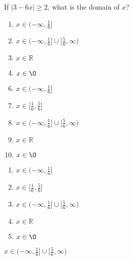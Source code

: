  
If $|3-6x|\geq 2$, what is the domain of $x$?


\ifsat
	\begin{enumerate}[label=\Alph*)]
		\item $x\in (-\infty,${\Large$\frac{1}{6}$}$]$
		\item $x\in (-\infty,${\Large$\frac{1}{6}$}$]\cup[${\Large$\frac{5}{6}$}$,\infty)$ %
		\item $x\in\mathbb{R} $ 
		\item $x\in\O$
	\end{enumerate}
\else
\fi

\ifacteven
	\begin{enumerate}[label=\textbf{\Alph*.},itemsep=\fill,align=left]
		\setcounter{enumii}{5}
		\item $x\in (-\infty,${\Large$\frac{1}{6}$}$]$
		\item $x\in [${\Large$\frac{1}{6}$}$,${\Large$\frac{5}{6}$}$]$
		\item $x\in (-\infty,${\Large$\frac{1}{6}$}$]\cup[${\Large$\frac{5}{6}$}$,\infty)$ %
		\addtocounter{enumii}{1}
		\item $x\in\mathbb{R} $ 
		\item $x\in\O$
	\end{enumerate}
\else
\fi

\ifactodd
	\begin{enumerate}[label=\textbf{\Alph*.},itemsep=\fill,align=left]
		\item $x\in (-\infty,${\Large$\frac{1}{6}$}$]$
		\item $x\in [${\Large$\frac{1}{6}$}$,${\Large$\frac{5}{6}$}$]$
		\item $x\in (-\infty,${\Large$\frac{1}{6}$}$]\cup[${\Large$\frac{5}{6}$}$,\infty)$ %
		\item $x\in\mathbb{R} $ 
		\item $x\in\O$
	\end{enumerate}
\else
\fi

\ifgridin
 $x\in (-\infty,${\Large$\frac{1}{6}$}$]\cup[${\Large$\frac{5}{6}$}$,\infty)$ %
		
\else
\fi

